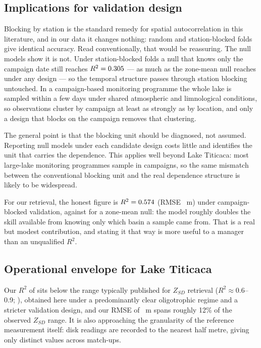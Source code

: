 \documentclass[preprint,review,12pt,authoryear]{elsarticle}
\begin{document}
\subsection{Implications for validation design}

Blocking by station is the standard remedy for spatial autocorrelation in
this literature, and in our data it changes nothing: random and
station-blocked folds give identical accuracy. Read conventionally, that
would be reassuring. The null models show it is not. Under station-blocked
folds a null that knows only the campaign date still reaches
$R^2=0.305$ --- as much as the zone-mean null
reaches under any design --- so the temporal structure passes through station
blocking untouched. In a campaign-based monitoring programme the whole lake is
sampled within a few days under shared atmospheric and limnological
conditions, so observations cluster by campaign at least as strongly as by
location, and only a design that blocks on the campaign removes that
clustering.

The general point is that the blocking unit should be diagnosed, not assumed.
Reporting null models under each candidate design costs little and identifies
the unit that carries the dependence. This applies well beyond Lake Titicaca:
most large-lake monitoring programmes sample in campaigns, so the same
mismatch between the conventional blocking unit and the real dependence
structure is likely to be widespread.

For our retrieval, the honest figure is $R^2=0.574{}$ (RMSE
\numHeadlineRmse~m) under campaign-blocked validation, against
\numNullZonaRTwo{} for a zone-mean null: the model roughly doubles the skill
available from knowing only which basin a sample came from. That is a real
but modest contribution, and stating it that way is more useful to a manager
than an unqualified $R^2$.

\subsection{Operational envelope for Lake Titicaca}\label{sec:envelope}

Our $R^2$ of \numHeadlineRTwo{} sits below the range typically published for
$Z_{SD}$ retrieval ($R^2\approx0.6$--0.9; \citealp{Zhang2022,Lee2015}),
obtained here under a predominantly clear oligotrophic regime and a stricter
validation design, and our RMSE of \numHeadlineRmse~m spans roughly 12\% of
the observed $Z_{SD}$ range. It is also approaching the granularity of the reference measurement itself:
disk readings are recorded to the nearest half metre, giving only
\numSecchiUniqueValues{} distinct values across \numMatchupsSecchi{}
match-ups.
\end{document}
